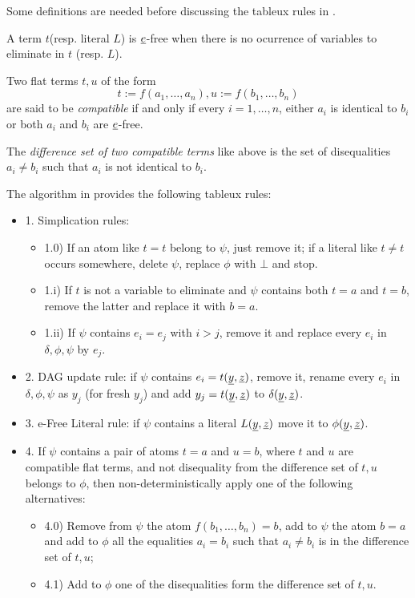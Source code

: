 Some definitions are needed before discussing the tableux rules in 
\cite{ghilardi2020compactly}.

\begin{definition}
  A term $t$(resp. literal $L$) is $\underline{e}$-free when there is no ocurrence
  of variables to eliminate in $t$ (resp. $L$).

  Two flat terms $t, u$ of the form 
  \begin{equation*}
    t := f(a_1, \dots, a_n), u := f(b_1, \dots, b_n)
  \end{equation*}
  are said to be \emph{compatible} if and only if every $i = 1, \dots, n$, either
  $a_i$ is identical to $b_i$ or both $a_i$ and $b_i$ are $\underline{e}$-free.

  The \emph{difference set of two compatible terms} like above is the
  set of disequalities $a_i \neq b_i$ such that $a_i$ is not identical
  to $b_i$.
\end{definition}

The algorithm in \cite{ghilardi2020compactly} provides the following 
tableux rules:

\begin{itemize}
  \item[] 1. Simplication rules:
    \begin{itemize}
      \item 1.0) If an atom like $t = t$ belong to $\psi$, just remove it; if a
      literal like $t \neq t$ occurs somewhere, delete $\psi$, replace $\phi$
      with $\bot$ and stop.
    \item 1.i) If $t$ is not a variable to eliminate and $\psi$ contains
    both $t = a$ and $t = b$, remove the latter and replace it with $b = a$.
  \item 1.ii) If $\psi$ contains $e_i = e_j$ with $i > j$, remove it
  and replace every $e_i$ in $\delta, \phi, \psi$ by $e_j$.
    \end{itemize}
  \item[] 2. DAG update rule: if $\psi$ contains $e_i = t(\underline{y}, \underline{z})$, remove
    it, rename every $e_i$ in $\delta, \phi, \psi$ as $y_j$ (for fresh $y_j$)
    and add $y_j = t(\underline{y}, \underline{z})$ to $\delta(\underline{y}, \underline{z})$.
  \item[] 3.  e-Free Literal rule: if $\psi$ contains a literal $L(\underline{y}, \underline{z})$
    move it to $\phi(\underline{y}, \underline{z})$.
  \item[] 4.  If $\psi$ contains a pair of atoms $t = a$ and $u = b$, where
    $t$ and $u$ are compatible flat terms, and not disequality from the difference
    set of $t, u$ belongs to $\phi$, then non-deterministically apply one of the
    following alternatives:
    \begin{itemize}
      \item 4.0) Remove from $\psi$ the atom $f(b_1, \dots, b_n) = b$, add
      to $\psi$ the atom $b = a$ and add to $\phi$ all the equalities
      $a_i = b_i$ such that $a_i \neq b_i$ is in the difference set of $t, u$;
      \item 4.1) Add to $\phi$ one of the disequalities form the difference
      set of $t, u$.
    \end{itemize}
\end{itemize}

